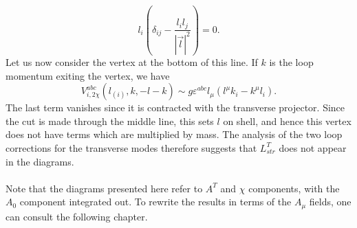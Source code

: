 \documentclass{article}
\begin{document}
\begin{equation}
    l_i\left(\delta_{ij}-\frac{l_il_j}{|\vec{l}|^2}\right)=0.
\end{equation}
Let us now consider the vertex at the bottom of this line. If $k$ is the loop momentum exiting the vertex, we have 
\begin{equation}
     V_{i,2\chi}^{abc}(l_{(i)},k,-l-k)\sim g\varepsilon^{abc}l_{\mu}\left(l^{\mu}k_i-k^{\mu}l_i\right).
\end{equation}
The last term vanishes since it is contracted with the transverse projector. Since the cut is made through the middle line, this sets $l$ on shell, and hence this vertex does not have terms which are multiplied by mass. The analysis of the two loop corrections for the transverse modes therefore suggests that $L^T_{str}$  does not appear in the diagrams. 
\\\\
Note that the diagrams presented here refer to $A^T$ and $\chi$ components, with the $A_0$ component integrated out. To rewrite the results in terms of the $A_{\mu}$ fields, one can consult the following chapter. 
\end{document}
